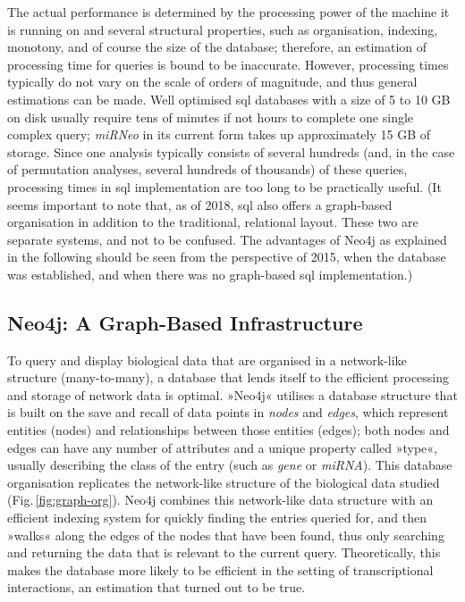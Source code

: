 The actual performance is determined by the processing power of the machine it is running on and several structural properties, such as organisation, indexing, monotony, and of course the size of the database; therefore, an estimation of processing time for queries is bound to be inaccurate. However, processing times typically do not vary on the scale of orders of magnitude, and thus general estimations can be made. Well optimised \ac{sql} databases with a size of 5 to 10 GB on disk usually require tens of minutes if not hours to complete one single complex query;\cite{Chaudhuri2004} \textit{miRNeo} in its current form takes up approximately 15 GB of storage. Since one analysis typically consists of several hundreds (and, in the case of permutation analyses, several hundreds of thousands) of these queries, processing times in \ac{sql} implementation are too long to be practically useful. (It seems important to note that, as of 2018, \ac{sql} also offers a graph-based organisation in addition to the traditional, relational layout. These two are separate systems, and not to be confused. The advantages of Neo4j as explained in the following should be seen from the perspective of 2015, when the database was established, and when there was no graph-based \ac{sql} implementation.)

\subsection{Neo4j: A Graph-Based Infrastructure}
To query and display biological data that are organised in a network-like structure (many-to-many), a database that lends itself to the efficient processing and storage of network data is optimal. »Neo4j« utilises a database structure that is built on the save and recall of data points in \emph{nodes} and \emph{edges}, which represent entities (nodes) and relationships between those entities (edges); both nodes and edges can have any number of attributes and a unique property called »type«, usually describing the class of the entry (such as \emph{gene} or \emph{miRNA}). This database organisation replicates the network-like structure of the biological data studied (Fig.\,\ref{fig:graph-org}). Neo4j combines this network-like data structure with an efficient indexing system for quickly finding the entries queried for, and then »walks« along the edges of the nodes that have been found, thus only searching and returning the data that is relevant to the current query. Theoretically, this makes the database more likely to be efficient in the setting of transcriptional interactions, an estimation that turned out to be true.

